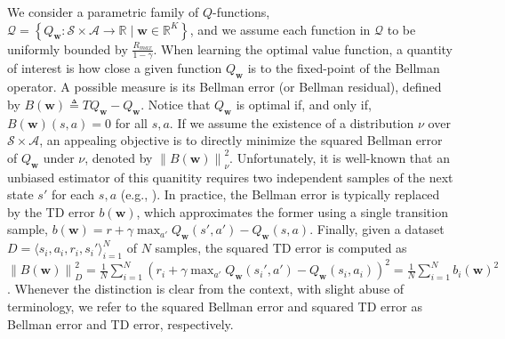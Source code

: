 \documentclass{article}
\newcommand{\norm}[1]{\left\lVert #1 \right\rVert}
\begin{document}
We consider a parametric family of $Q$-functions, $\mathcal{Q} = \left\{ Q_{\bm{w}} : \mathcal{S}\times\mathcal{A} \rightarrow \mathbb{R} \mid \bm{w}\in\mathbb{R}^K\right\}$, and we assume each function in $\mathcal{Q}$ to be uniformly bounded by $\frac{R_{max}}{1-\gamma}$. When learning the optimal value function, a quantity of interest is how close a given function $Q_{\bm{w}}$ is to the fixed-point of the Bellman operator. A possible measure is its Bellman error (or Bellman residual), defined by $B(\bm{w}) \triangleq TQ_{\bm{w}} - Q_{\bm{w}}$. Notice that $Q_{\bm{w}}$ is optimal if, and only if, $B(\bm{w})(s,a) = 0$ for all $s,a$. If we assume the existence of a distribution $\nu$ over $\mathcal{S}\times\mathcal{A}$, an appealing objective is to directly minimize the squared Bellman error of $Q_{\bm{w}}$ under $\nu$, denoted by $\norm{B(\bm{w})}_{\nu}^2$. Unfortunately, it is well-known that an unbiased estimator of this quanitity requires two independent samples of the next state $s'$ for each $s,a$ (e.g., \cite{maillard2010finite}). In practice, the Bellman error is typically replaced by the TD error $b(\bm{w})$, which approximates the former using a single transition sample, $b(\bm{w}) = r + \gamma\max_{a'}Q_{\bm{w}}(s',a') - Q_{\bm{w}}(s,a)$. Finally, given a dataset $D = \langle s_i,a_i,r_i,s_i' \rangle_{i=1}^{N}$ of $N$ samples, the squared TD error is computed as $\norm{B(\bm{w})}_{D}^2 = \frac{1}{N}\sum_{i=1}^N (r_i + \gamma \max_{a'} Q_{\bm{w}}(s_i',a') - Q_{\bm{w}}(s_i,a_i))^2 = \frac{1}{N}\sum_{i=1}^N b_i(\bm{w})^2$. Whenever the distinction is clear from the context, with slight abuse of terminology, we refer to the squared Bellman error and squared TD error as Bellman error and TD error, respectively.
\end{document}

